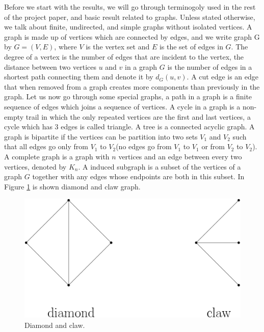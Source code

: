 \documentclass[12pt,a4paper,titlepage,openany]{report}
\begin{document}
Before we start with the results, we will go through terminogoly used in the rest of the project paper, and basic result related to graphs. Unless stated otherwise, we talk about finite, undirected, and simple graphs without isolated vertices. A graph is made up of vertices which are connected by edges, and we write graph G by $G=(V,E)$, where $V$ is the vertex set and $E$ is the set of edges in $G$. The degree of a vertex is the number of edges that are incident to the vertex, the distance between two vertices $u$ and $v$ in a graph $G$ is the number of edges in a shortest path connecting them and denote it by $d_G(u,v)$. A cut edge is an edge that when removed from a graph creates more components than previously in the graph. Let us now go through some special graphs, a path in a graph is a finite sequence of edges which joins a sequence of vertices. A cycle in a graph is a non-empty trail in which the only repeated vertices are the first and last vertices, a cycle which has 3 edges is called triangle. A tree is a connected acyclic graph. A graph is bipartite if the vertices can be partition into two sets $V_1$ and $V_2$ such that all edges go only from $V_1$ to $V_2$(no edges go from $V_1$ to $V_1$ or from $V_2$ to $V_2$). A complete graph is a graph with $n$ vertices and an edge between every two vertices, denoted by $K_n$. A induced subgraph is a subset of the vertices of a graph $G$ together with any edges whose endpoints are both in this subset. In Figure \ref{diaclaw} is shown diamond and claw graph.

\begin{figure}[h]
\begin{center}
\includegraphics[width=0.5\linewidth]{figures/diaclaw.png}
\end{center}
\caption{Diamond and claw.}\label{diaclaw}
\end{figure}
\end{document}
